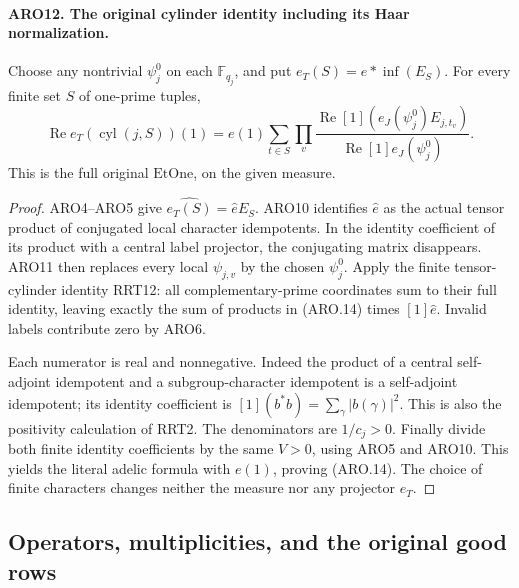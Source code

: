 \paragraph{ARO12. The original cylinder identity including its Haar normalization.}
\label{claim:ARO12}
Choose any nontrivial \(\psi_j^0\) on each \(\mathbb F_{q_j}\),
and put \(e_T(S)=e*\operatorname{inf}(E_S)\).  For every finite
set \(S\) of one-prime tuples,
\[
 \operatorname{Re}e_T(\operatorname{cyl}(j,S))(1)
   =e(1)\sum_{t\in S}\prod_v
      \frac{\operatorname{Re}[1](e_J(\psi_j^0)E_{j,t_v})}
           {\operatorname{Re}[1]e_J(\psi_j^0)}.
 \tag{ARO.14}
\]
This is the full original \(\mathrm{EtOne}\), on the given measure.
\begin{proof}
ARO4--ARO5 give \(\widehat{e_T(S)}=\widehat e E_S\).
ARO10 identifies \(\widehat e\) as the actual tensor product of
conjugated local character idempotents.  In the identity coefficient
of its product with a central label projector, the conjugating
matrix disappears.  ARO11 then replaces every local \(\psi_{j,v}\)
by the chosen \(\psi_j^0\).  Apply the finite tensor-cylinder
identity RRT12: all complementary-prime coordinates sum to their
full identity, leaving exactly the sum of products in (ARO.14)
times \([1]\widehat e\).  Invalid labels contribute zero by ARO6.

Each numerator is real and nonnegative.  Indeed the product of a
central self-adjoint idempotent and a subgroup-character idempotent
is a self-adjoint idempotent; its identity coefficient is
\([1](b^*b)=\sum_\gamma|b(\gamma)|^2\).  This is also the
positivity calculation of RRT2.  The denominators are \(1/c_j>0\).
Finally divide both finite identity coefficients by the same
\(V>0\), using ARO5 and ARO10.  This yields the literal adelic
formula with \(e(1)\), proving (ARO.14).  The choice of finite
characters changes neither the measure nor any projector \(e_T\).
\end{proof}

\subsection{Operators, multiplicities, and the original good rows}

